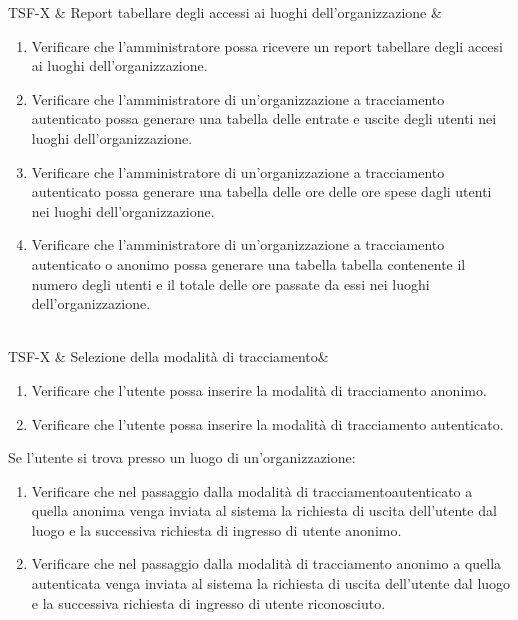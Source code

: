 TSF-X & Report tabellare degli accessi ai luoghi dell'organizzazione  & \begin{enumerate}
\item Verificare che l'amministratore possa ricevere un report tabellare degli accesi ai luoghi dell'organizzazione.
\item Verificare che l'amministratore di un'organizzazione a tracciamento autenticato possa generare una tabella delle entrate e uscite degli utenti nei luoghi dell'organizzazione.
\item Verificare che l'amministratore di un'organizzazione a tracciamento autenticato possa generare una tabella delle ore delle ore spese dagli utenti nei luoghi dell'organizzazione.
\item Verificare che l'amministratore di un'organizzazione a tracciamento autenticato o anonimo possa generare una tabella tabella contenente il numero degli utenti e il totale delle ore passate da essi nei luoghi dell’organizzazione. 
\end{enumerate} \\


TSF-X & Selezione della modalità di tracciamento& \begin{enumerate}
    \item Verificare che l'utente possa inserire la modalità di tracciamento anonimo.
    \item Verificare che l'utente possa inserire la modalità di tracciamento autenticato.
\end{enumerate}
Se l'utente si trova presso un luogo di un'organizzazione:
\begin{enumerate}
    \item Verificare che nel passaggio dalla modalità di tracciamentoautenticato a quella anonima venga inviata al sistema la richiesta di uscita dell'utente dal luogo e la successiva richiesta di ingresso di utente anonimo.
    \item Verificare che nel passaggio dalla modalità di tracciamento anonimo a quella autenticata venga inviata al sistema la richiesta di uscita dell'utente dal luogo e la successiva richiesta di ingresso di utente riconosciuto.
\end{enumerate} \\

